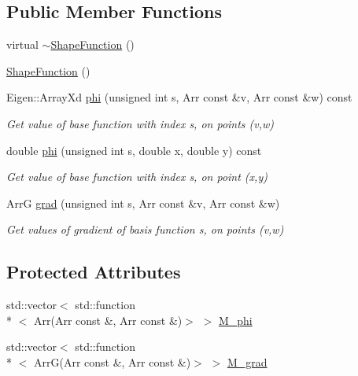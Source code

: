 \subsection*{Public Member Functions}
\begin{DoxyCompactItemize}
\item 
virtual \hyperlink{classTspeed_1_1ShapeFunction_abfab4ad1f425751c62102f74f6ff8040}{$\sim$\-Shape\-Function} ()
\item 
\hyperlink{classTspeed_1_1ShapeFunction_ad445923bd9ccbd1c50580f43a6342f5c}{Shape\-Function} ()
\item 
Eigen\-::\-Array\-Xd \hyperlink{classTspeed_1_1ShapeFunction_a30886f42b86096f6ea4b621cd4255dd1}{phi} (unsigned int s, Arr const \&v, Arr const \&w) const 
\begin{DoxyCompactList}\small\item\em Get value of base function with index s, on points (v,w) \end{DoxyCompactList}\item 
double \hyperlink{classTspeed_1_1ShapeFunction_a45ca655484d81ea09b474ae628d79ecf}{phi} (unsigned int s, double x, double y) const 
\begin{DoxyCompactList}\small\item\em Get value of base function with index s, on point (x,y) \end{DoxyCompactList}\item 
Arr\-G \hyperlink{classTspeed_1_1ShapeFunction_aac13d9c4a86f3a2f9b188a199676c2da}{grad} (unsigned int s, Arr const \&v, Arr const \&w)
\begin{DoxyCompactList}\small\item\em Get values of gradient of basis function s, on points (v,w) \end{DoxyCompactList}\end{DoxyCompactItemize}
\subsection*{Protected Attributes}
\begin{DoxyCompactItemize}
\item 
std\-::vector$<$ std\-::function\\*
$<$ Arr(Arr const \&, Arr const \&)$>$ $>$ \hyperlink{classTspeed_1_1ShapeFunction_a6d8010d0c9d5e40f21f57c8201149ad5}{M\-\_\-phi}
\item 
std\-::vector$<$ std\-::function\\*
$<$ Arr\-G(Arr const \&, Arr const \&)$>$ $>$ \hyperlink{classTspeed_1_1ShapeFunction_a282cf4ac589829f07a6c24e443d7bd05}{M\-\_\-grad}
\end{DoxyCompactItemize}


